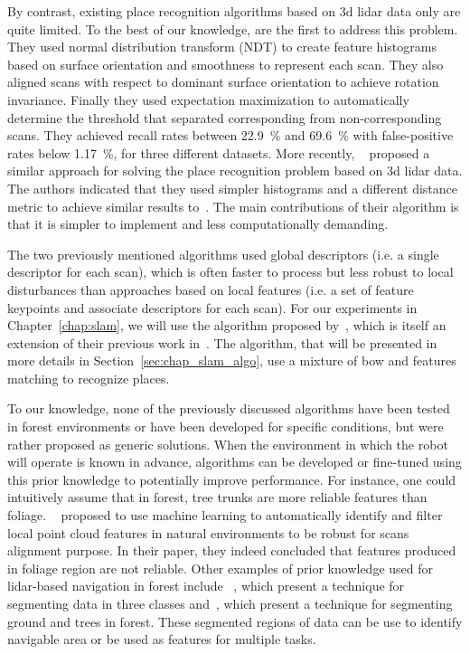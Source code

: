 By contrast, existing place recognition algorithms based on \gls*{3d} \gls*{lidar} data only are quite limited. To the best of our knowledge, \citet{Magnusson2009} are the first to address this problem. They used normal distribution transform (NDT) to create feature histograms based on surface orientation and smoothness to represent each scan. They also aligned scans with respect to dominant surface orientation to achieve rotation invariance. Finally they used expectation maximization to automatically determine the threshold that separated corresponding from non-corresponding scans. They achieved recall rates between \SI{22.9}{\percent} and \SI{69.6}{\percent} with false-positive rates below \SI{1.17}{\percent}, for three different datasets. More recently, ~\citet{Mack2015} proposed a similar approach for solving the place recognition problem based on \gls*{3d} lidar data. The authors indicated that they used simpler histograms and a different distance metric to achieve similar results to~\citet{Magnusson2009}. The main contributions of their algorithm is that it is simpler to implement and less computationally demanding.

The two previously mentioned algorithms used global descriptors (i.e. a single descriptor for each scan), which is often faster to process but less robust to local disturbances than approaches based on local features (i.e. a set of feature keypoints and associate descriptors for each scan). For our experiments in Chapter~\ref{chap:slam}, we will use the algorithm proposed by~\citet{Steder2011b}, which is itself an extension of their previous work in~\citep{Steder2010}. The algorithm, that will be presented in more details in Section~\ref{sec:chap_slam_algo}, use a mixture of \gls*{bow} and features matching to recognize places.


To our knowledge, none of the previously discussed algorithms have been tested in forest environments or have been developed for specific conditions, but were rather proposed as generic solutions. When the environment in which the robot will operate is known in advance, algorithms can be developed or fine-tuned using this prior knowledge to potentially improve performance. For instance, one could intuitively assume that in forest, tree trunks are more reliable features than foliage. ~\citet{Latulippe2013} proposed to use machine learning to automatically identify and filter local point cloud features in natural environments to be robust for scans alignment purpose. In their paper, they indeed concluded that features produced in foliage region are not reliable. Other examples of prior knowledge used for \gls*{lidar}-based navigation in forest include ~\citep{Lalonde2006}, which present a technique for segmenting data in three classes and~\citep{Mcdaniel2012}, which present a technique for segmenting ground and trees in forest. These segmented regions of data can be use to identify navigable area or be used as features for multiple tasks.

